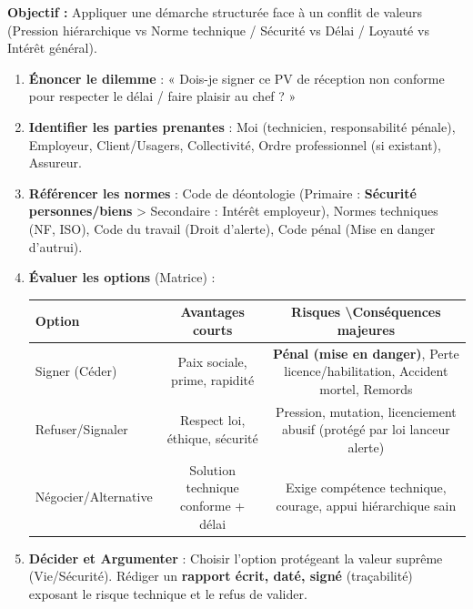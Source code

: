 \documentclass[11pt]{article}
\newcommand{\cle}[1]{{\popxbold\color{popdark}#1}}
\begin{document}
\begin{methode}
    \textbf{Objectif :} Appliquer une démarche structurée face à un conflit de valeurs (Pression hiérarchique vs Norme technique / Sécurité vs Délai / Loyauté vs Intérêt général).
    \begin{enumerate}
        \item \textbf{Énoncer le dilemme} : « Dois-je signer ce PV de réception non conforme pour respecter le délai / faire plaisir au chef ? »
        \item \textbf{Identifier les parties prenantes} : Moi (technicien, responsabilité pénale), Employeur, Client/Usagers, Collectivité, Ordre professionnel (si existant), Assureur.
        \item \textbf{Référencer les normes} : Code de déontologie (Primaire : \textbf{Sécurité personnes/biens} > Secondaire : Intérêt employeur), Normes techniques (NF, ISO), Code du travail (Droit d'alerte), Code pénal (Mise en danger d'autrui).
        \item \textbf{Évaluer les options} (Matrice) :
        \begin{center}
        \begin{tabular}{|l|c|c|}\hline
        \textbf{Option} & \textbf{Avantages courts} & \textbf{Risques \textbackslash Conséquences majeures} \\ \hline
        Signer (Céder) & Paix sociale, prime, rapidité & \textbf{Pénal (mise en danger)}, Perte licence/habilitation, Accident mortel, Remords \\ \hline
        Refuser/Signaler & Respect loi, éthique, sécurité & Pression, mutation, licenciement abusif (protégé par loi lanceur alerte) \\ \hline
        Négocier/Alternative & Solution technique conforme + délai & Exige compétence technique, courage, appui hiérarchique sain \\ \hline
        \end{tabular}
        \end{center}
        \item \textbf{Décider et Argumenter} : Choisir l'option protégeant la \cle{valeur suprême (Vie/Sécurité)}. Rédiger un \textbf{rapport écrit, daté, signé} (traçabilité) exposant le risque technique et le refus de valider.
    \end{enumerate}
\end{methode}
\end{document}
